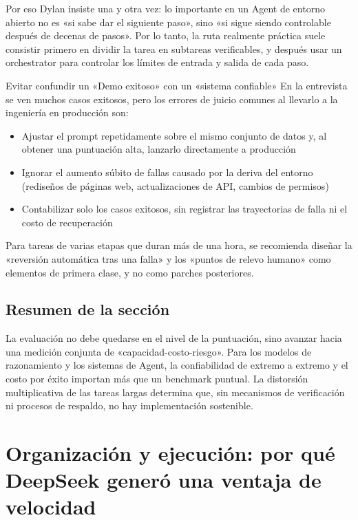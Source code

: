 \documentclass[a4paper]{article}
\begin{document}
Por eso Dylan insiste una y otra vez: lo importante en un Agent de entorno abierto no es «si sabe dar el siguiente paso», sino «si sigue siendo controlable después de decenas de pasos». Por lo tanto, la ruta realmente práctica suele consistir primero en dividir la tarea en subtareas verificables, y después usar un orchestrator para controlar los límites de entrada y salida de cada paso.

\begin{warningbox}{Evitar confundir un «Demo exitoso» con un «sistema confiable»}
En la entrevista se ven muchos casos exitosos, pero los errores de juicio comunes al llevarlo a la ingeniería en producción son:
\begin{itemize}
    \item Ajustar el prompt repetidamente sobre el mismo conjunto de datos y, al obtener una puntuación alta, lanzarlo directamente a producción
    \item Ignorar el aumento súbito de fallas causado por la deriva del entorno (rediseños de páginas web, actualizaciones de API, cambios de permisos)
    \item Contabilizar solo los casos exitosos, sin registrar las trayectorias de falla ni el costo de recuperación
\end{itemize}

Para tareas de varias etapas que duran más de una hora, se recomienda diseñar la «reversión automática tras una falla» y los «puntos de relevo humano» como elementos de primera clase, y no como parches posteriores.
\end{warningbox}

\subsection{Resumen de la sección}

La evaluación no debe quedarse en el nivel de la puntuación, sino avanzar hacia una medición conjunta de «capacidad-costo-riesgo». Para los modelos de razonamiento y los sistemas de Agent, la confiabilidad de extremo a extremo y el costo por éxito importan más que un benchmark puntual. La distorsión multiplicativa de las tareas largas determina que, sin mecanismos de verificación ni procesos de respaldo, no hay implementación sostenible.
\section{Organización y ejecución: por qué DeepSeek generó una ventaja de velocidad}
\end{document}
